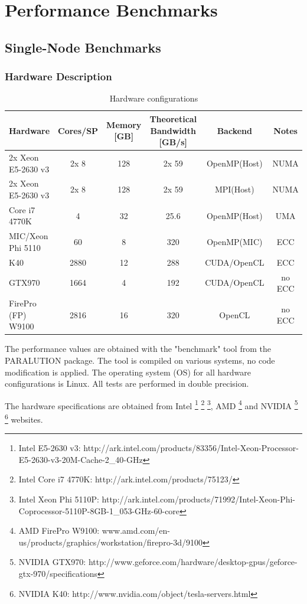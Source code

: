 \chapter{Performance Benchmarks}

\section{Single-Node Benchmarks}

\subsection{Hardware Description}

\begin{table}[!h]
  \centering
\begin{tabular}{l| c c c c c}
    \hline
  Hardware & Cores/SP & Memory  [GB] & Theoretical Bandwidth [GB/s] & Backend & Notes\\
    \hline \hline
  2x Xeon E5-2630 v3& 2x 8 & 128 & 2x 59   & OpenMP(Host) & NUMA
  \\ \hline  
  2x Xeon E5-2630 v3& 2x 8 & 128 & 2x 59   & MPI(Host)    & NUMA\\ \hline
  Core i7 4770K     &   4  & 32  & 25.6    & OpenMP(Host) & UMA\\ \hline
  MIC/Xeon Phi 5110 &   60 & 8   &  320    & OpenMP(MIC)  & ECC\\ \hline
  K40               &  2880& 12  &  288    & CUDA/OpenCL  & ECC\\ \hline
  GTX970            &  1664& 4   &  192    & CUDA/OpenCL  & no ECC\\ \hline
  FirePro (FP) W9100&  2816& 16  &  320    & OpenCL       & no ECC\\ \hline
\end{tabular}
\caption{Hardware configurations}
\end{table}

The performance values are obtained with the "benchmark" tool from the PARALUTION package. The tool is compiled on various systems, no code modification is applied. The operating system (OS) for all hardware configurations is Linux. All tests are performed in double precision.

The hardware specifications are obtained from
Intel
\footnote{Intel E5-2630 v3: http://ark.intel.com/products/83356/Intel-Xeon-Processor-E5-2630-v3-20M-Cache-2\_40-GHz}
\footnote{Intel Core i7 4770K: http://ark.intel.com/products/75123/}
\footnote{Intel Xeon Phi 5110P: http://ark.intel.com/products/71992/Intel-Xeon-Phi-Coprocessor-5110P-8GB-1\_053-GHz-60-core},
AMD
\footnote{AMD FirePro W9100: www.amd.com/en-us/products/graphics/workstation/firepro-3d/9100}
and
NVIDIA
\footnote{NVIDIA GTX970: http://www.geforce.com/hardware/desktop-gpus/geforce-gtx-970/specifications}
\footnote{NVIDIA K40: http://www.nvidia.com/object/tesla-servers.html}
websites.

